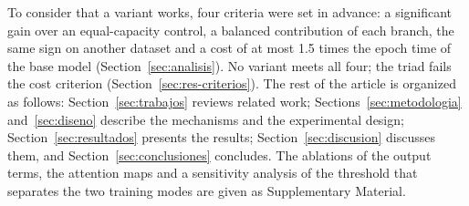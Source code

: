 To consider that a variant works, four criteria were set in advance: a significant gain over an equal-capacity control, a balanced contribution of each branch, the same sign on another dataset and a cost of at most 1.5 times the epoch time of the base model (Section~\ref{sec:analisis}). No variant meets all four; the triad fails the cost criterion (Section~\ref{sec:res-criterios}). The rest of the article is organized as follows: Section~\ref{sec:trabajos} reviews related work; Sections~\ref{sec:metodologia} and~\ref{sec:diseno} describe the mechanisms and the experimental design; Section~\ref{sec:resultados} presents the results; Section~\ref{sec:discusion} discusses them, and Section~\ref{sec:conclusiones} concludes. The ablations of the output terms, the attention maps and a sensitivity analysis of the threshold that separates the two training modes are given as Supplementary Material.
